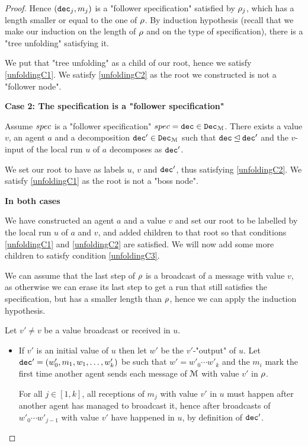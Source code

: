 \begin{proof}
	Hence $(\mathtt{dec}_j, m_j)$ is a "follower specification" satisfied by $\rho_j$, which has a length smaller or equal to the one of $\rho$. By induction hypothesis (recall that we make our induction on the length of $\rho$ and on the type of specification), there is a "tree unfolding" satisfying it.
	
	We put that "tree unfolding" as a child of our root, hence we satisfy \ref{unfoldingC1}. We satisfy \ref{unfoldingC2} as the root we constructed is not a "follower node".
	
	\textbf{Case 2: The specification is a "follower specification"} 
	
	Assume $\spec$ is a "follower specification" $\spec = \decsymb \in \decset{\messages}$. 
	There exists a value $v$, an agent $a$ and a decomposition $\mathtt{dec}' \in \mathtt{Dec}_{\mathcal{M}}$ such that $\mathtt{dec} \unlhd \mathtt{dec}'$ and the $v$-input of the local run $u$ of $a$ decomposes as $\mathtt{dec}'$. 
	
	We set our root to have as labels $u$, $v$ and $\mathtt{dec}'$, thus satisfying \ref{unfoldingC2}. We satisfy \ref{unfoldingC1} as the root is not a "boss node".
	
	\textbf{In both cases}
	
	We have constructed an agent $a$ and a value $v$ and set our root to be labelled by the local run $u$ of $a$ and $v$, and added children to that root so that conditions \ref{unfoldingC1} and \ref{unfoldingC2} are satisfied. We will now add some more children to satisfy condition \ref{unfoldingC3}.
	
	We can assume that the last step of $\rho$ is a broadcast of a message with value $v$, as otherwise we can erase its last step to get a run that still satisfies the specification, but has a smaller length than $\rho$, hence we can apply the induction hypothesis.
	
	Let $v' \neq v$ be a value broadcast or received in $u$. 
	
	\begin{itemize}
		\item If $v'$ is an initial value of $u$ then let $w'$ be the $v'$-"output" of $u$. Let $\mathtt{dec}' = (w'_0, m_1, w_1, \ldots, w'_k)$ be such that $w' = w'_0 \cdots w'_k$ and the $m_i$ mark the first time another agent sends each message of $\mathcal{M}$ with value $v'$ in $\rho$.  
		
		For all $j \in [1,k]$, all receptions of $m_j$ with value $v'$ in $u$ must happen after another agent has managed to broadcast it, hence after broadcasts of $w'_0 \cdots w'_{j-1}$ with value $v'$ have happened in $u$, by definition of $\mathtt{dec}'$.
		

\end{itemize}
\end{proof}
